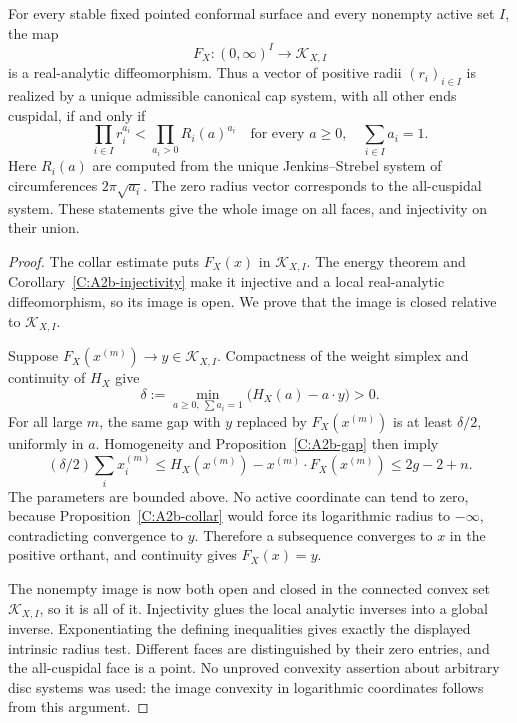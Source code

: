 \begin{theorem}
\label{C:A2b-image}
For every stable fixed pointed conformal surface and every nonempty active set $I$, the map
\[
 F_X:(0,\infty)^I\longrightarrow\mathcal K_{X,I}
\]
is a real-analytic diffeomorphism. Thus a vector of positive radii $(r_i)_{i\in I}$ is realized by a unique admissible canonical cap system, with all other ends cuspidal, if and only if
\[
 \prod_{i\in I}r_i^{a_i}
 <\prod_{a_i>0}R_i(a)^{a_i}
 \quad\text{for every }a\geq0,\quad\sum_{i\in I}a_i=1.
\]
Here $R_i(a)$ are computed from the unique Jenkins--Strebel system of circumferences $2\pi\sqrt{a_i}$. The zero radius vector corresponds to the all-cuspidal system. These statements give the whole image on all faces, and injectivity on their union.
\end{theorem}
\begin{proof}
The collar estimate puts $F_X(x)$ in $\mathcal K_{X,I}$. The energy theorem and Corollary~\ref{C:A2b-injectivity} make it injective and a local real-analytic diffeomorphism, so its image is open. We prove that the image is closed relative to $\mathcal K_{X,I}$.

Suppose $F_X(x^{(m)})\to y\in\mathcal K_{X,I}$. Compactness of the weight simplex and continuity of $H_X$ give
\[
 \delta:=\min_{a\geq0,\ \sum a_i=1}\bigl(H_X(a)-a\cdot y\bigr)>0.
\]
For all large $m$, the same gap with $y$ replaced by $F_X(x^{(m)})$ is at least $\delta/2$, uniformly in $a$. Homogeneity and Proposition~\ref{C:A2b-gap} then imply
\[
 (\delta/2)\sum_i x_i^{(m)}
 \leq H_X(x^{(m)})-x^{(m)}\cdot F_X(x^{(m)})
 \leq2g-2+n.
\]
The parameters are bounded above. No active coordinate can tend to zero, because Proposition~\ref{C:A2b-collar} would force its logarithmic radius to $-\infty$, contradicting convergence to $y$. Therefore a subsequence converges to $x$ in the positive orthant, and continuity gives $F_X(x)=y$.

The nonempty image is now both open and closed in the connected convex set $\mathcal K_{X,I}$, so it is all of it. Injectivity glues the local analytic inverses into a global inverse. Exponentiating the defining inequalities gives exactly the displayed intrinsic radius test. Different faces are distinguished by their zero entries, and the all-cuspidal face is a point. No unproved convexity assertion about arbitrary disc systems was used: the image convexity in logarithmic coordinates follows from this argument.
\end{proof}

